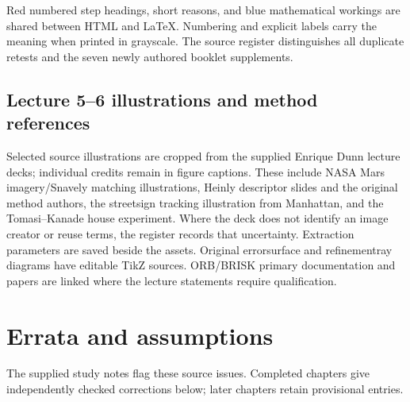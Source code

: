 \documentclass[letterpaper,11pt,english,openany,oneside]{jupyterBook}
\begin{document}
\sphinxAtStartPar
Red numbered step headings, short reasons, and blue mathematical workings are shared between HTML and LaTeX. Numbering and explicit labels carry the meaning when printed in grayscale. The source register distinguishes all duplicate retests and the seven newly authored booklet supplements.


\section{Lecture 5–6 illustrations and method references}
\label{\detokenize{reference/credits:lecture-56-illustrations-and-method-references}}
\sphinxAtStartPar
Selected source illustrations are cropped from the supplied Enrique Dunn lecture decks; individual credits remain in figure captions. These include NASA Mars imagery/Snavely matching illustrations, Heinly descriptor slides and the original method authors, the street\sphinxhyphen{}sign tracking illustration from Manhattan, and the Tomasi–Kanade house experiment. Where the deck does not identify an image creator or reuse terms, the register records that uncertainty. Extraction parameters are saved beside the assets. Original error\sphinxhyphen{}surface and refinement\sphinxhyphen{}ray diagrams have editable TikZ sources. ORB/BRISK primary documentation and papers are linked where the lecture statements require qualification.

\sphinxstepscope


\chapter{Errata and assumptions}
\label{\detokenize{reference/errata:errata-and-assumptions}}\label{\detokenize{reference/errata:errata}}\label{\detokenize{reference/errata::doc}}
\sphinxAtStartPar
The supplied study notes flag these source issues. Completed chapters give independently checked corrections below; later chapters retain provisional entries.
\end{document}
